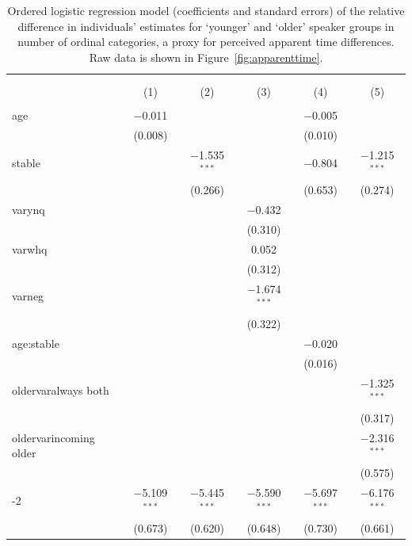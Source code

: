 \begin{table}[htbp] \centering 
  \caption[Ordered logistic regression model (coefficients and standard errors) of the relative difference in individuals' estimates for `younger' and `older' speaker groups in number of ordinal categories]{Ordered logistic regression model (coefficients and standard errors) of the relative difference in individuals' estimates for `younger' and `older' speaker groups in number of ordinal categories, a proxy for perceived apparent time differences. Raw data is shown in Figure~\ref{fig:apparenttime}.} 
  \label{table:apparenttimemodel} 
\begin{tabular}{@{\extracolsep{5pt}}lccccc} 
\\[-1.8ex]\hline 
\hline \\[-1.8ex] 
\\[-1.8ex] & (1) & (2) & (3) & (4) & (5)\\ 
\hline \\[-1.8ex] 
 age & $-$0.011 &  &  & $-$0.005 &  \\ 
  & (0.008) &  &  & (0.010) &  \\ 
  stable &  & $-$1.535$^{***}$ &  & $-$0.804 & $-$1.215$^{***}$ \\ 
  &  & (0.266) &  & (0.653) & (0.274) \\ 
  varynq &  &  & $-$0.432 &  &  \\ 
  &  &  & (0.310) &  &  \\ 
  varwhq &  &  & 0.052 &  &  \\ 
  &  &  & (0.312) &  &  \\ 
  varneg &  &  & $-$1.674$^{***}$ &  &  \\ 
  &  &  & (0.322) &  &  \\ 
  age:stable &  &  &  & $-$0.020 &  \\ 
  &  &  &  & (0.016) &  \\ 
  oldervaralways both &  &  &  &  & $-$1.325$^{***}$ \\ 
  &  &  &  &  & (0.317) \\ 
  oldervarincoming older &  &  &  &  & $-$2.316$^{***}$ \\ 
  &  &  &  &  & (0.575) \\ 
  -2\textbar -1 & $-$5.109$^{***}$ & $-$5.445$^{***}$ & $-$5.590$^{***}$ & $-$5.697$^{***}$ & $-$6.176$^{***}$ \\ 
  & (0.673) & (0.620) & (0.648) & (0.730) & (0.661) \\ 

\end{tabular}
\end{table}
